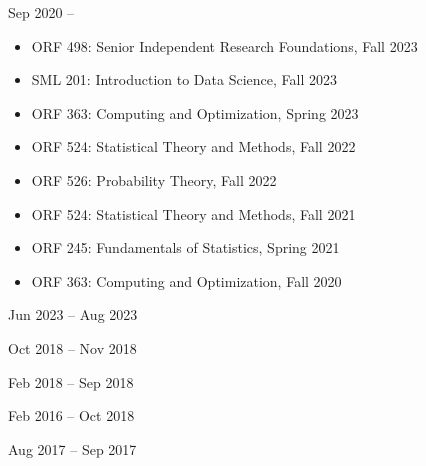 \documentclass[
  date,
  number,
]{wgu-cv}
\begin{document}
\vspace*{-4mm}


{}
{Sep 2020 --}

\begin{itemize}

  \item
    ORF 498:
    Senior Independent Research Foundations,
    Fall 2023

  \item
    SML 201:
    Introduction to Data Science,
    Fall 2023

  \item
    ORF 363:
    Computing and Optimization,
    Spring 2023

  \item
    ORF 524:
    Statistical Theory and Methods,
    Fall 2022

  \item
    ORF 526:
    Probability Theory,
    Fall 2022

  \item
    ORF 524:
    Statistical Theory and Methods,
    Fall 2021

  \item
    ORF 245:
    Fundamentals of Statistics,
    Spring 2021

  \item
    ORF 363:
    Computing and Optimization,
    Fall 2020

\end{itemize}

{}
{Jun 2023 -- Aug 2023}
\vspace*{2mm}

{}
{Oct 2018 -- Nov 2018}
\vspace*{2mm}

{}
{Feb 2018 -- Sep 2018}
\vspace*{2mm}

{}
{Feb 2016 -- Oct 2018}
\vspace*{2mm}

{}
{Aug 2017 -- Sep 2017}
\vspace*{2mm}
\end{document}
